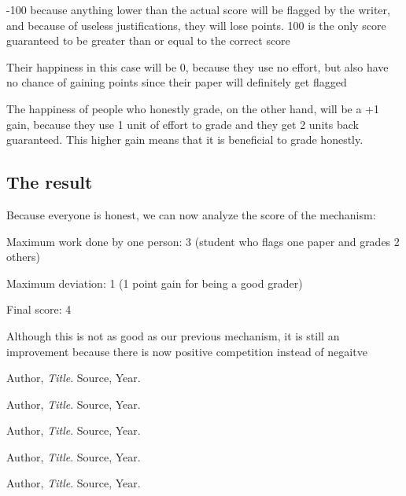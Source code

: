 \documentclass[12pt, Helvetica]{article}
\begin{document}
-100 because anything lower than the actual score will be flagged by the writer, and because of useless justifications, they will lose points. 100 is the only score guaranteed to be greater than or equal to the correct score

Their happiness in this case will be 0, because they use no effort, but also have no chance of gaining points since their paper will definitely get flagged

The happiness of people who honestly grade, on the other hand, will be a +1 gain, because they use 1 unit of effort to grade and they get 2 units back guaranteed. This higher gain means that it is beneficial to grade honestly.

\subsection{The result}
Because everyone is honest, we can now analyze the score of the mechanism:

Maximum work done by one person: 3 (student who flags one paper and grades 2 others)

Maximum deviation: 1 (1 point gain for being a good grader)

Final score: 4

Although this is not as good as our previous mechanism, it is still an improvement because there is now positive competition instead of negaitve

\begin{thebibliography}{9}

  Author,
  \emph{Title}.
  Source,
  Year.

  Author,
  \emph{Title}.
  Source,
  Year.

  Author,
  \emph{Title}.
  Source,
  Year.

  Author,
  \emph{Title}.
  Source,
  Year.

  Author,
  \emph{Title}.
  Source,
  Year.

\end{thebibliography}
\end{document}
